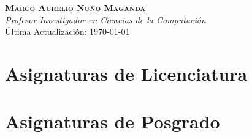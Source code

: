 \documentclass[letterpaper,10pt]{article}
\newcounter{num}
\begin{document}
\begin{center}
    \textbf{\Large \scshape Marco Aurelio Nuño Maganda} \\ \vspace{1pt}
    \textit{Profesor Investigador en Ciencias de la Computación} \\
    Última Actualización: \today \\
\end{center}



\section{Asignaturas de Licenciatura}
\begin{refsection}[AsignaturasLicenciatura]
\nocite{*}
\printbibliography[heading={none}, keyword=AsignaturasLicenciatura, resetnumbers=true]
\end{refsection}


\section{Asignaturas de Posgrado}
\begin{refsection}[AsignaturasPosgrado]
\nocite{*}
\printbibliography[heading={none}, keyword=AsignaturasPosgrado, resetnumbers=true]
\end{refsection}
\end{document}
